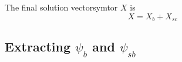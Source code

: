 \documentclass [10pt,letterpaper]{article}
\begin{document}
The final solution vectorsymtor $X$ is
\begin{equation} \label{eq:X-Xb-Xsc}
	X=X_b+X_{sc}
\end{equation}


\subsection{Extracting $\psi_b$ and $\psi_{sb}$}
\label{sub:extracting-psib-and-psisb}
\end{document}
